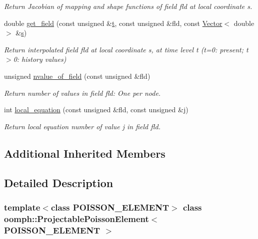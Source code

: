 \begin{DoxyCompactItemize}
\begin{DoxyCompactList}\small\item\em Return Jacobian of mapping and shape functions of field fld at local coordinate s. \end{DoxyCompactList}\item 
double \hyperlink{classoomph_1_1ProjectablePoissonElement_a39f08edb4ea9e6c4e0def984cee288c6}{get\+\_\+field} (const unsigned \&\hyperlink{cfortran_8h_af6f0bd3dc13317f895c91323c25c2b8f}{t}, const unsigned \&fld, const \hyperlink{classoomph_1_1Vector}{Vector}$<$ double $>$ \&\hyperlink{cfortran_8h_ab7123126e4885ef647dd9c6e3807a21c}{s})
\begin{DoxyCompactList}\small\item\em Return interpolated field fld at local coordinate s, at time level t (t=0\+: present; t$>$0\+: history values) \end{DoxyCompactList}\item 
unsigned \hyperlink{classoomph_1_1ProjectablePoissonElement_a006f46a3072037df9f301ed71af56ac1}{nvalue\+\_\+of\+\_\+field} (const unsigned \&fld)
\begin{DoxyCompactList}\small\item\em Return number of values in field fld\+: One per node. \end{DoxyCompactList}\item 
int \hyperlink{classoomph_1_1ProjectablePoissonElement_af13ec8e584c3ab11cb501030220fcb87}{local\+\_\+equation} (const unsigned \&fld, const unsigned \&j)
\begin{DoxyCompactList}\small\item\em Return local equation number of value j in field fld. \end{DoxyCompactList}\end{DoxyCompactItemize}
\subsection*{Additional Inherited Members}


\subsection{Detailed Description}
\subsubsection*{template$<$class P\+O\+I\+S\+S\+O\+N\+\_\+\+E\+L\+E\+M\+E\+NT$>$\newline
class oomph\+::\+Projectable\+Poisson\+Element$<$ P\+O\+I\+S\+S\+O\+N\+\_\+\+E\+L\+E\+M\+E\+N\+T $>$}

